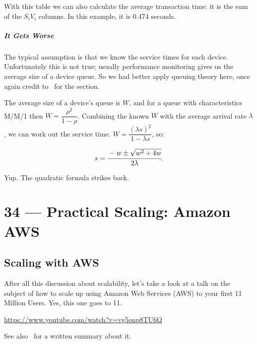 \documentclass[a4paper]{report}
\begin{document}
With this table we can also calculate the average transaction time: it is the sum of the $S_{i}V_{i}$ columns. In this example, it is 0.474 seconds. 

\paragraph*{It Gets Worse}

The typical assumption is that we know the service times for each device. Unfortunately this is not true; usually performance monitoring gives us the average size of a device queue. So we had better apply queuing theory here, once again credit to~\cite{williams-calc} for the section. 

The average size of a device's queue is $W$, and for a queue with characteristics M/M/1 then $W = \dfrac{\rho^{2}}{1-\rho}$. Combining the known $W$ with the average arrival rate $\lambda$, we can work out the service time. $W = \dfrac{(\lambda s)^{2}}{1 - \lambda s}$, so:

\[ s = \cfrac{-w \pm \sqrt{w^{2}+4w}}{2\lambda}.\]

Yup. The quadratic formula strikes back. 









\chapter*{34 --- Practical Scaling: Amazon AWS}


\section*{Scaling with AWS}

After all this discussion about scalability, let's take a look at a talk on the subject of how to scale up using Amazon Web Services (AWS) to your first 11 Million Users. Yes, this one goes to 11.


\begin{center}
\url{https://www.youtube.com/watch?v=vg5onp8TU6Q}
\end{center}

See also~\cite{awsscale} for a written summary about it.
\end{document}
